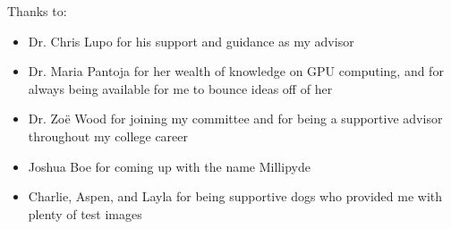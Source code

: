 \noindent
Thanks to:
\begin{itemize}
    \item Dr. Chris Lupo for his support and guidance as my advisor
    \item Dr. Maria Pantoja for her wealth of knowledge on GPU computing, and for always being available for me to bounce ideas off of her
    \item Dr. Zoë Wood for joining my committee and for being a supportive advisor throughout my college career
    \item Joshua Boe for coming up with the name Millipyde
    \item Charlie, Aspen, and Layla for being supportive dogs who provided me with plenty of test images
\end{itemize}
